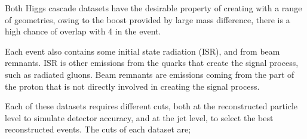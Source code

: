     Both Higgs cascade datasets have the desirable property of creating  with a range of geometries,
    owing to the boost provided by large mass difference,
    there is a high chance of overlap with 4  in the event.

    Each event also contains some initial state radiation (ISR),
    and from beam remnants.
    ISR is other emissions from the quarks that create the signal process,
    such as radiated gluons.
    Beam remnants are emissions coming from the part of the proton that is not directly involved
    in creating the signal process.


    Each of these datasets requires different cuts,
    both at the reconstructed particle level to simulate detector accuracy,
    and at the jet level, to select the best reconstructed events.
    The cuts of each dataset are;

